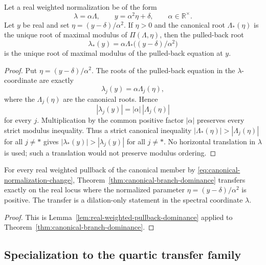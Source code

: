 \begin{lemma}\label{lem:real-weighted-pullback-dominance}
Let a real weighted normalization be of the form
\[
\lambda=\alpha\Lambda,
\qquad
y=\alpha^2\eta+\delta,
\qquad \alpha\in\mathbb R^\times .
\]
Let $y$ be real and set $\eta=(y-\delta)/\alpha^2$.  If $\eta>0$ and the canonical root $\Lambda_*(\eta)$ is the unique root of maximal modulus of $\Pi(\Lambda,\eta)$, then the pulled-back root
\[
\lambda_*(y)=\alpha\Lambda_*\bigl((y-\delta)/\alpha^2\bigr)
\]
is the unique root of maximal modulus of the pulled-back equation at $y$.
\end{lemma}
\begin{proof}
Put $\eta=(y-\delta)/\alpha^2$.  The roots of the pulled-back equation in the $\lambda$-coordinate are exactly
\[
\lambda_j(y)=\alpha\Lambda_j(\eta),
\]
where the $\Lambda_j(\eta)$ are the canonical roots.  Hence
\[
|\lambda_j(y)|=|\alpha|\,|\Lambda_j(\eta)|
\]
for every $j$.  Multiplication by the common positive factor $|\alpha|$ preserves every strict modulus inequality.  Thus a strict canonical inequality
$|\Lambda_*(\eta)|>|\Lambda_j(\eta)|$ for all $j\ne *$ gives
$|\lambda_*(y)|>|\lambda_j(y)|$ for all $j\ne *$.  No horizontal translation in $\lambda$ is used; such a translation would not preserve modulus ordering.
\end{proof}

\begin{corollary}\label{cor:canonical-dominance-after-normalization}
For every real weighted pullback of the canonical member by \eqref{eq:canonical-normalization-change}, Theorem~\ref{thm:canonical-branch-dominance} transfers exactly on the real locus where the normalized parameter $\eta=(y-\delta)/\alpha^2$ is positive.  The transfer is a dilation-only statement in the spectral coordinate $\lambda$.
\end{corollary}
\begin{proof}
This is Lemma~\ref{lem:real-weighted-pullback-dominance} applied to Theorem~\ref{thm:canonical-branch-dominance}.
\end{proof}

\subsection{Specialization to the quartic transfer family}

